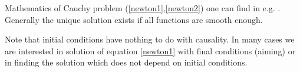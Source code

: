\documentclass[11pt]{book}
\begin{document}
Mathematics of  Cauchy problem (\ref{newton1},\ref{newton2}) 
one can find in e.g. \cite{arnold-ode}. Generally the unique solution exists if
all functions are smooth enough.

Note that initial conditions have nothing to do with causality. In many cases we are
interested in solution of equation \eqref{newton1} with final 
conditions (aiming) or in finding the solution which does not 
depend on initial conditions.




\printbibliography[
heading=bibintoc,
title={References}
] 
\clearpage
\end{document}
